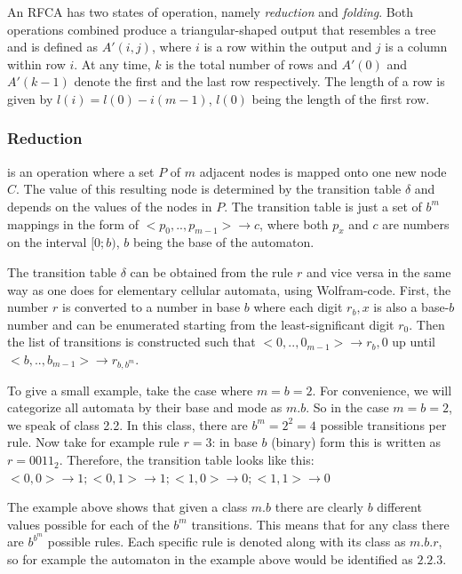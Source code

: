 \documentclass{llncs}
\begin{document}
An RFCA has two states of operation, namely \emph{reduction} and \emph{folding}. Both operations combined produce a triangular-shaped output that resembles a tree and is defined as $A'(i,j)$, where $i$ is a row within the output and $j$ is a column within row $i$. At any time, $k$ is the total number of rows and $A'(0)$ and $A'(k-1)$ denote the first and the last row respectively. The length of a row is given by $l(i) = l(0)-i(m-1)$, $l(0)$ being the length of the first row.
\subsubsection{Reduction} is an operation where a set $P$ of $m$ adjacent nodes is mapped onto one new node $C$. The value of this resulting node is determined by the transition table $\delta$ and depends on the values of the nodes in $P$. The transition table is just a set of $b^m$ mappings in the form of $<p_0,..,p_{m-1}> \to c$, where both $p_x$ and $c$ are numbers on the interval $[0;b)$, $b$ being the base of the automaton. 

The transition table $\delta$ can be obtained from the rule $r$ and vice versa in the same way as one does for elementary cellular automata, using Wolfram-code\cite{elemca}. First, the number $r$ is converted to a number in base $b$ where each digit $r_b,x$ is also a base-$b$ number and can be enumerated starting from the least-significant digit $r_0$. Then the list of transitions is constructed such that $<0,..,0_{m-1}> \to r_b,0$ up until $<b,..,b_{m-1}> \to r_{b,b^m}$.

To give a small example, take the case where $m=b=2$. For convenience, we will categorize all automata by their base and mode as $m.b$. So in the case $m=b=2$, we speak of class 2.2. In this class, there are $b^m=2^2=4$ possible transitions per rule. Now take for example rule $r=3$: in base $b$ (binary) form this is written as $r=0011_2$. Therefore, the transition table looks like this: $<0,0>\to1;<0,1>\to1;<1,0>\to0;<1,1>\to0$

The example above shows that given a class $m.b$ there are clearly $b$ different values possible for each of the $b^m$ transitions. This means that for any class there are $b^{b^m}$ possible rules. Each specific rule is denoted along with its class as $m.b.r$, so for example the automaton in the example above would be identified as $2.2.3$.
\end{document}
